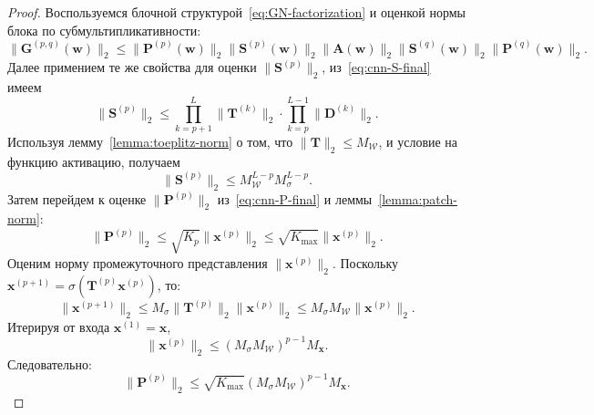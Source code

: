 \begin{proof}
Воспользуемся блочной структурой~\eqref{eq:GN-factorization} и оценкой нормы блока по субмультипликативности:
\begin{equation}
    \|\mathbf{G}^{(p, q)}(\mathbf{w})\|_2 \leqslant \|\mathbf{P}^{(p)}(\mathbf{w})\|_2 \|\mathbf{S}^{(p)}(\mathbf{w})\|_2 \|\mathbf{A}(\mathbf{w})\|_2 \|\mathbf{S}^{(q)}(\mathbf{w})\|_2 \|\mathbf{P}^{(q)}(\mathbf{w})\|_2.
\end{equation}
Далее примением те же свойства для оценки $\|\mathbf{S}^{(p)}\|_2$, из~\eqref{eq:cnn-S-final} имеем
\begin{equation}
    \|\mathbf{S}^{(p)}\|_2 \leqslant \prod_{k=p+1}^{L} \|\mathbf{T}^{(k)}\|_2 \cdot \prod_{k=p}^{L-1} \|\mathbf{D}^{(k)}\|_2.
\end{equation}
Используя лемму~\ref{lemma:toeplitz-norm} о том, что $\|\mathbf{T}\|_2 \leqslant M_{\mathcal{W}}$, и условие на функцию активацию, получаем
\begin{equation}
    \|\mathbf{S}^{(p)}\|_2 \leqslant M_{\mathcal{W}}^{L-p} M_{\sigma}^{L-p}.    
\end{equation}
Затем перейдем к оценке $\|\mathbf{P}^{(p)}\|_2$ из~\eqref{eq:cnn-P-final} и леммы~\ref{lemma:patch-norm}:
\begin{equation}
    \|\mathbf{P}^{(p)}\|_2 \leqslant \sqrt{K_p} \|\mathbf{x}^{(p)}\|_2 \leqslant \sqrt{K_{\text{max}}} \|\mathbf{x}^{(p)}\|_2.    
\end{equation}
Оценим норму промежуточного представления $\|\mathbf{x}^{(p)}\|_2$. Поскольку $\mathbf{x}^{(p+1)} = \sigma(\mathbf{T}^{(p)}\mathbf{x}^{(p)})$, то:
\begin{equation}
    \|\mathbf{x}^{(p+1)}\|_2 \leqslant M_{\sigma} \|\mathbf{T}^{(p)}\|_2 \|\mathbf{x}^{(p)}\|_2 \leqslant M_{\sigma} M_{\mathcal{W}} \|\mathbf{x}^{(p)}\|_2.
\end{equation}
Итерируя от входа $\mathbf{x}^{(1)}=\mathbf{x}$,
\begin{equation}
    \|\mathbf{x}^{(p)}\|_2 \leqslant (M_{\sigma} M_{\mathcal{W}})^{p-1} M_{\mathbf{x}}.
\end{equation}
Следовательно:
\begin{equation}
    \|\mathbf{P}^{(p)}\|_2 \leqslant \sqrt{K_{\text{max}}} (M_{\sigma} M_{\mathcal{W}})^{p-1} M_{\mathbf{x}}.
\end{equation}


\end{proof}
